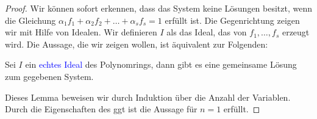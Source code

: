 \begin{proof}
Wir können sofort erkennen, dass das System keine Lösungen besitzt, wenn die Gleichung $\alpha_1f_1 + \alpha_2f_2+ \ldots + \alpha_sf_s = 1$  erfüllt ist. Die Gegenrichtung zeigen wir mit Hilfe von Idealen. Wir definieren $I$ als das Ideal, das von $f_1,\ldots,f_s$ erzeugt wird. Die Aussage, die wir zeigen wollen, ist äquivalent zur Folgenden:
\begin{lemma}
Sei $I$ ein \textcolor{blue}{echtes Ideal} des Polynomrings, dann gibt es eine gemeinsame Lösung zum gegebenen System.
\end{lemma}    
Dieses Lemma beweisen wir durch Induktion über die Anzahl der Variablen. Durch die Eigenschaften des ggt ist die Aussage für $n = 1$ erfüllt.    
\end{proof}

